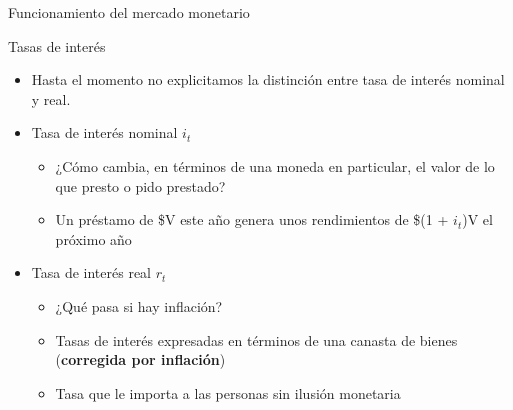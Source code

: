 \documentclass{beamer}
\begin{document}
\begin{frame}{Funcionamiento del mercado monetario}
    \begin{center}
        \begin{figure}[H]
            \renewcommand{\figurename}{Figure}
            \begin{center}
            \end{center}
        \end{figure}
    \end{center}
\end{frame}

\begin{frame}{Tasas de interés}
    
    \begin{itemize}
        \item Hasta el momento no explicitamos la distinción entre tasa de interés nominal y real.
        \item Tasa de interés nominal $i_t$
        \begin{itemize}
            \item ¿Cómo cambia, en términos de una moneda en particular, el valor de lo que presto o pido prestado? \\
            \item Un préstamo de \$V este año genera unos rendimientos de \$(1 + $i_t$)V el próximo año
        \end{itemize}
        \item Tasa de interés real $r_t$
        \begin{itemize}
            \item ¿Qué pasa si hay inflación?
            \item Tasas de interés expresadas en términos de una canasta de bienes (\textbf{corregida por inflación})
            \item Tasa que le importa a las personas sin ilusión monetaria
        \end{itemize}
    \end{itemize}
\end{frame}
\end{document}
